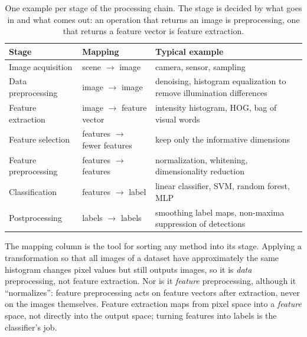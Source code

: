 \begin{table}[ht]
  \centering
  \begin{tabular}{@{}p{3.2cm}p{4.6cm}p{5.2cm}@{}}
    \toprule
    Stage & Mapping & Typical example \\
    \midrule
    Image acquisition & scene $\rightarrow$ image & camera, sensor, sampling \\
    Data preprocessing & image $\rightarrow$ image & denoising, histogram
      equalization to remove illumination differences \\
    Feature extraction & image $\rightarrow$ feature vector & intensity
      histogram, HOG, bag of visual words \\
    Feature selection & features $\rightarrow$ fewer features & keep only the
      informative dimensions \\
    Feature preprocessing & features $\rightarrow$ features & normalization,
      whitening, dimensionality reduction \\
    Classification & features $\rightarrow$ label & linear classifier, SVM,
      random forest, MLP \\
    Postprocessing & labels $\rightarrow$ labels & smoothing label maps,
      non-maxima suppression of detections \\
    \bottomrule
  \end{tabular}
  \caption{One example per stage of the processing chain. The stage is decided
  by what goes in and what comes out: an operation that returns an image is
  preprocessing, one that returns a feature vector is feature extraction.}
  \label{tab:processing-chain}
\end{table}

\noindent
The mapping column is the tool for sorting any method into its stage. Applying
a transformation so that all images of a dataset have approximately the same
histogram changes pixel values but still outputs images, so it is \emph{data}
preprocessing, not feature extraction. Nor is it \emph{feature} preprocessing,
although it ``normalizes'': feature preprocessing acts on feature vectors after
extraction, never on the images themselves. Feature extraction maps from pixel space
into a \emph{feature} space, not directly into the output space; turning features
into labels is the classifier's job.

